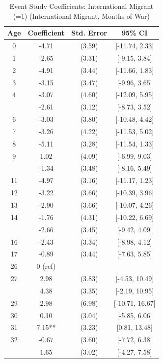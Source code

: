 \begin{table}[!h]
\centering
\caption{\label{tab:event_study_8a_intl_migrant_months}Event Study Coefficients: International Migrant (=1) (International Migrant, Months of War)}
\centering
\fontsize{9}{11}\selectfont
\begin{threeparttable}
\begin{tabular}[t]{cccc}
\toprule
Age & Coefficient & Std. Error & 95\% CI\\
\midrule
0 & -4.71 & (3.59) & {}[-11.74, 2.33]\\
1 & -2.65 & (3.31) & {}[-9.15, 3.84]\\
2 & -4.91 & (3.44) & {}[-11.66, 1.83]\\
3 & -3.15 & (3.47) & {}[-9.96, 3.65]\\
4 & -3.07 & (4.60) & {}[-12.09, 5.95]\\
\addlinespace
5 & -2.61 & (3.12) & {}[-8.73, 3.52]\\
6 & -3.03 & (3.80) & {}[-10.48, 4.42]\\
7 & -3.26 & (4.22) & {}[-11.53, 5.02]\\
8 & -5.11 & (3.28) & {}[-11.54, 1.33]\\
9 & 1.02 & (4.09) & {}[-6.99, 9.03]\\
\addlinespace
10 & -1.34 & (3.48) & {}[-8.16, 5.49]\\
11 & -4.97 & (3.16) & {}[-11.17, 1.23]\\
12 & -3.22 & (3.66) & {}[-10.39, 3.96]\\
13 & -2.90 & (3.66) & {}[-10.07, 4.26]\\
14 & -1.76 & (4.31) & {}[-10.22, 6.69]\\
\addlinespace
15 & -2.66 & (3.45) & {}[-9.42, 4.09]\\
16 & -2.43 & (3.34) & {}[-8.98, 4.12]\\
17 & -0.89 & (3.44) & {}[-7.63, 5.85]\\
26 & 0 (ref) &  & \\
27 & 2.98 & (3.83) & {}[-4.53, 10.49]\\
\addlinespace
28 & 4.38 & (3.35) & {}[-2.19, 10.95]\\
29 & 2.98 & (6.98) & {}[-10.71, 16.67]\\
30 & 0.10 & (3.04) & {}[-5.85, 6.06]\\
31 & 7.15** & (3.23) & {}[0.81, 13.48]\\
32 & -0.67 & (3.60) & {}[-7.72, 6.38]\\
\addlinespace
33 & 1.65 & (3.02) & {}[-4.27, 7.58]\\

\end{tabular}
\end{threeparttable}
\end{table}
